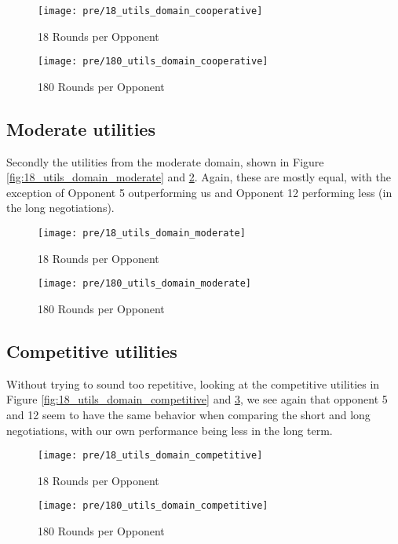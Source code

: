 \begin{figure}[!htb]
	\texttt{[image: pre/18\_utils\_domain\_cooperative]}
	\caption{18 Rounds per Opponent}
	\label{fig:18_utils_domain_cooperative}
	\endminipage\hfill
	\texttt{[image: pre/180\_utils\_domain\_cooperative]}
	\caption{180 Rounds per Opponent}
	\label{fig:180_utils_domain_cooperative}
	\endminipage\hfill
\end{figure}

\subsection{Moderate utilities}

Secondly the utilities from the moderate domain, shown in Figure \ref{fig:18_utils_domain_moderate} and \ref{fig:180_utils_domain_moderate}. Again, these are mostly equal, with the exception of Opponent 5 outperforming us and Opponent 12 performing less (in the long negotiations). 

\begin{figure}[!htb]
	\texttt{[image: pre/18\_utils\_domain\_moderate]}
	\caption{18 Rounds per Opponent}
	\label{fig:18_utils_domain_moderate}
	\endminipage\hfill
	\texttt{[image: pre/180\_utils\_domain\_moderate]}
	\caption{180 Rounds per Opponent}
	\label{fig:180_utils_domain_moderate}
	\endminipage\hfill
\end{figure}

\subsection{Competitive utilities}

Without trying to sound too repetitive, looking at the competitive utilities in  Figure \ref{fig:18_utils_domain_competitive} and \ref{fig:180_utils_domain_competitive}, we see again that opponent 5 and 12 seem to have the same behavior when comparing the short and long negotiations, with our own performance being less in the long term.

\begin{figure}[!htb]
	\texttt{[image: pre/18\_utils\_domain\_competitive]}
	\caption{18 Rounds per Opponent}
	\label{fig:18_utils_domain_competitive}
	\endminipage\hfill
	\texttt{[image: pre/180\_utils\_domain\_competitive]}
	\caption{180 Rounds per Opponent}
	\label{fig:180_utils_domain_competitive}
	\endminipage\hfill
\end{figure}